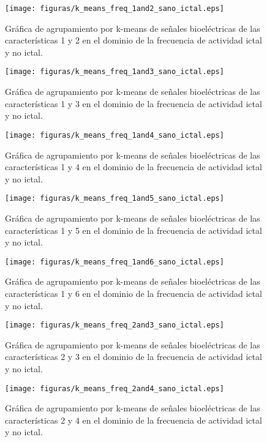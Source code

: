 \begin{figure}[H]
    \centering
    \texttt{[image: figuras/k\_means\_freq\_1and2\_sano\_ictal.eps]}
    \caption{Gráfica de agrupamiento por k-means de señales bioeléctricas de las características 1 y 2 en el dominio de la frecuencia de actividad ictal y no ictal.}
    \label{fig: k_means_freq_1_2}
\end{figure}
\begin{figure}[H]
    \centering
    \texttt{[image: figuras/k\_means\_freq\_1and3\_sano\_ictal.eps]}
    \caption{Gráfica de agrupamiento por k-means de señales bioeléctricas de las características 1 y 3 en el dominio de la frecuencia de actividad ictal y no ictal.}
    \label{fig: k_means_freq_1_3}
\end{figure}
\begin{figure}[H]
    \centering
    \texttt{[image: figuras/k\_means\_freq\_1and4\_sano\_ictal.eps]}
    \caption{Gráfica de agrupamiento por k-means de señales bioeléctricas de las características 1 y 4 en el dominio de la frecuencia de actividad ictal y no ictal.}
    \label{fig: k_means_freq_1_4}
\end{figure}
\begin{figure}[H]
    \centering
    \texttt{[image: figuras/k\_means\_freq\_1and5\_sano\_ictal.eps]}
    \caption{Gráfica de agrupamiento por k-means de señales bioeléctricas de las características 1 y 5  en el dominio de la frecuencia de actividad ictal y no ictal.}
    \label{fig: k_means_freq_1_5}
\end{figure}
\begin{figure}[H]
    \centering
    \texttt{[image: figuras/k\_means\_freq\_1and6\_sano\_ictal.eps]}
    \caption{Gráfica de agrupamiento por k-means de señales bioeléctricas de las características 1 y 6 en el dominio de la frecuencia de actividad ictal y no ictal.}
    \label{fig: k_means_freq_1_6}
\end{figure}
\begin{figure}[H]
    \centering
    \texttt{[image: figuras/k\_means\_freq\_2and3\_sano\_ictal.eps]}
    \caption{Gráfica de agrupamiento por k-means de señales bioeléctricas de las características 2 y 3 en el dominio de la frecuencia de actividad ictal y no ictal.}
    \label{fig: k_means_freq_2_3}
\end{figure}
\begin{figure}[H]
    \centering
    \texttt{[image: figuras/k\_means\_freq\_2and4\_sano\_ictal.eps]}
    \caption{Gráfica de agrupamiento por k-means de señales bioeléctricas de las características 2 y 4 en el dominio de la frecuencia de actividad ictal y no ictal.}
    \label{fig: k_means_freq_2_4}
\end{figure}
